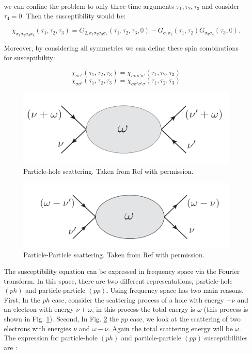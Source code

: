 \noindent we can confine the problem to only three-time arguments $\tau_1, \tau_2, \tau_3$ and consider $\tau_4=0$. Then the susceptibility would be:

\begin{equation}
    \chi _{\sigma_1 \sigma_2 \sigma_3 \sigma_4} (\tau_1 , \tau_2, \tau_3)= G_{2,\sigma_1 \sigma_2 \sigma_3 \sigma_4} (\tau_1 ,\tau_2, \tau_3,0)- G_{\sigma _1 \sigma _2}(\tau_1 , \tau _2) G_{\sigma _3 \sigma _4}(\tau_3 , 0).
\end{equation}


\noindent Moreover, by considering all symmetries we can define these spin combinations for susceptibility:

\begin{equation}
    \chi_{\sigma \sigma'}(\tau_1 , \tau_2, \tau_3)= \chi_{\sigma \sigma \sigma ' \sigma '}(\tau_1 , \tau_2, \tau_3) 
\end{equation}
\begin{equation}
    \chi_{\overline{\sigma \sigma'}}(\tau_1 , \tau_2, \tau_3)= \chi_{\sigma \sigma ' \sigma ' \sigma}(\tau_1 , \tau_2, \tau_3) 
\end{equation}

\begin{figure}[ht]
\centering
    \includegraphics[width=0.5\linewidth]{fig2/ph.pdf}
\caption{Particle-hole scattering. Taken from Ref \cite{Valli} with permission. \label{fig:ph}}
\end{figure}
\begin{figure}[ht]
\centering
    \includegraphics[width=0.55\linewidth]{fig2/pp.pdf}
\caption{Particle-Particle scattering. Taken from Ref \cite{Valli} with permission. \label{fig:pp}}
\end{figure}



The susceptibility equation can be expressed in frequency space via the Fourier transform. In this space, there are two different representations, particle-hole $(ph)$ and particle-particle $(pp)$. Using frequency space has two main reasons. First, In the $ph$ case, consider the scattering process of a hole with energy $- \nu$ and an electron with energy $\nu + \omega$, in this process the total energy is $\omega$ (this process is shown in Fig. \ref{fig:ph}). Second, In Fig. \ref{fig:pp} the $pp$ case, we look at the scattering of two electrons with energies $\nu$ and $\omega - \nu $. Again the total scattering energy will be $\omega$. The expression for particle-hole $(ph)$ and particle-particle $(pp)$ susceptibilities are  \cite{Valli, Macridin}:

